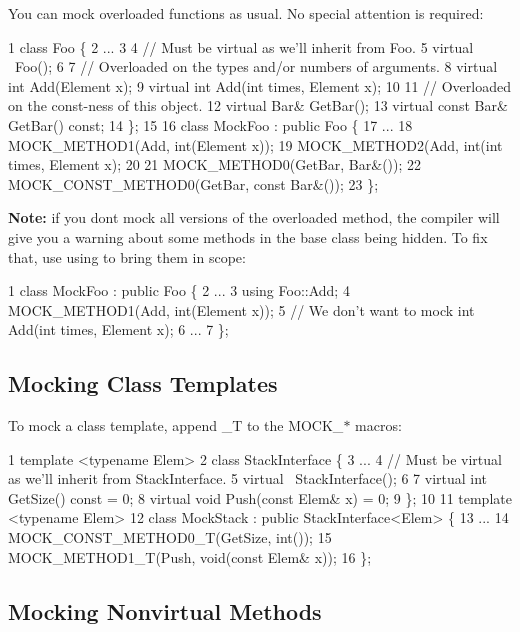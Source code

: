 You can mock overloaded functions as usual. No special attention is required\+:


\begin{DoxyCode}
1 class Foo \{
2   ...
3 
4   // Must be virtual as we'll inherit from Foo.
5   virtual ~Foo();
6 
7   // Overloaded on the types and/or numbers of arguments.
8   virtual int Add(Element x);
9   virtual int Add(int times, Element x);
10 
11   // Overloaded on the const-ness of this object.
12   virtual Bar& GetBar();
13   virtual const Bar& GetBar() const;
14 \};
15 
16 class MockFoo : public Foo \{
17   ...
18   MOCK\_METHOD1(Add, int(Element x));
19   MOCK\_METHOD2(Add, int(int times, Element x);
20 
21   MOCK\_METHOD0(GetBar, Bar&());
22   MOCK\_CONST\_METHOD0(GetBar, const Bar&());
23 \};
\end{DoxyCode}


{\bfseries Note\+:} if you don\textquotesingle{}t mock all versions of the overloaded method, the compiler will give you a warning about some methods in the base class being hidden. To fix that, use {\ttfamily using} to bring them in scope\+:


\begin{DoxyCode}
1 class MockFoo : public Foo \{
2   ...
3   using Foo::Add;
4   MOCK\_METHOD1(Add, int(Element x));
5   // We don't want to mock int Add(int times, Element x);
6   ...
7 \};
\end{DoxyCode}


\subsection*{Mocking Class Templates}

To mock a class template, append {\ttfamily \+\_\+T} to the {\ttfamily M\+O\+C\+K\+\_\+$\ast$} macros\+:


\begin{DoxyCode}
1 template <typename Elem>
2 class StackInterface \{
3   ...
4   // Must be virtual as we'll inherit from StackInterface.
5   virtual ~StackInterface();
6 
7   virtual int GetSize() const = 0;
8   virtual void Push(const Elem& x) = 0;
9 \};
10 
11 template <typename Elem>
12 class MockStack : public StackInterface<Elem> \{
13   ...
14   MOCK\_CONST\_METHOD0\_T(GetSize, int());
15   MOCK\_METHOD1\_T(Push, void(const Elem& x));
16 \};
\end{DoxyCode}


\subsection*{Mocking Nonvirtual Methods}

